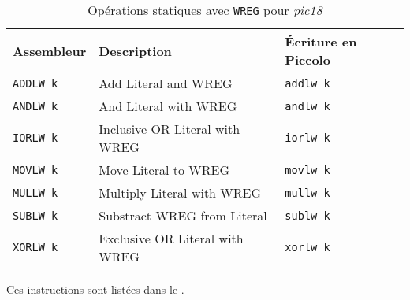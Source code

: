 \begin{table}[!ht]
  \centering
  \small
  \begin{tabular}{lll}
    \textbf{Assembleur} & \textbf{Description} & \textbf{Écriture en Piccolo}\\
    \hline
    \texttt{ADDLW k} & Add Literal and WREG & \texttt{addlw k}\\
    \texttt{ANDLW k} & And Literal with WREG & \texttt{andlw k}\\
    \texttt{IORLW k} & Inclusive OR Literal with WREG & \texttt{iorlw k}\\
    \texttt{MOVLW k} & Move Literal to WREG & \texttt{movlw k}\\
    \texttt{MULLW k} & Multiply Literal with WREG & \texttt{mullw k}\\
    \texttt{SUBLW k} & Substract WREG from Literal & \texttt{sublw k}\\
    \texttt{XORLW k} & Exclusive OR Literal with WREG & \texttt{xorlw k}\\
    \hline
  \end{tabular}
  \caption{Opérations statiques avec \texttt{WREG} pour \emph{pic18}}
\end{table}



Ces instructions sont listées dans le .

